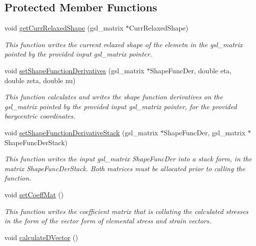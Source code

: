 \subsection*{Protected Member Functions}
\begin{DoxyCompactItemize}
\item 
void \hyperlink{classPrism_a3c252dc104a1ca7208b23c72737cd916}{get\+Curr\+Relaxed\+Shape} (gsl\+\_\+matrix $\ast$Curr\+Relaxed\+Shape)
\begin{DoxyCompactList}\small\item\em This function writes the current relaxed shape of the elemetn in the gsl\+\_\+matrix pointed by the provided input gsl\+\_\+matrix pointer. \end{DoxyCompactList}\item 
void \hyperlink{classPrism_aa1a4d3411d1f3dc05816ec01dcfa8310}{set\+Shape\+Function\+Derivatives} (gsl\+\_\+matrix $\ast$Shape\+Func\+Der, double eta, double zeta, double nu)
\begin{DoxyCompactList}\small\item\em This function calculates and writes the shape function derivatives on the gsl\+\_\+matrix pointed by the provided input gsl\+\_\+matrix pointer, for the provided barycentric coordinates. \end{DoxyCompactList}\item 
void \hyperlink{classPrism_aa1f76f3cabdd00eb057f41cebbaa466d}{set\+Shape\+Function\+Derivative\+Stack} (gsl\+\_\+matrix $\ast$Shape\+Func\+Der, gsl\+\_\+matrix $\ast$Shape\+Func\+Der\+Stack)
\begin{DoxyCompactList}\small\item\em This function writes the input gsl\+\_\+matrix Shape\+Func\+Der into a stack form, in the matrix Shape\+Func\+Der\+Stack. Both matrices must be allocated prior to calling the function. \end{DoxyCompactList}\item 
void \hyperlink{classPrism_a0575442613f8b7d9428c58cef19ab219}{set\+Coeff\+Mat} ()
\begin{DoxyCompactList}\small\item\em This function writes the coefficient matrix that is collating the calculated stresses in the form of the vector form of elemental stress and strain vectors. \end{DoxyCompactList}\item 
\hypertarget{classPrism_a1bf622277c72a0ee0372c0a30a15ae6d}{}void \hyperlink{classPrism_a1bf622277c72a0ee0372c0a30a15ae6d}{calculate\+D\+Vector} ()\label{classPrism_a1bf622277c72a0ee0372c0a30a15ae6d}


\end{DoxyCompactItemize}

